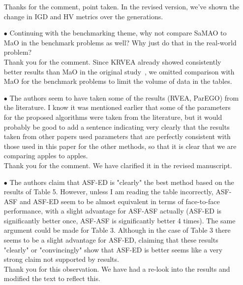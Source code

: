 \documentclass[onecolumn,10pt]{asme2ej}
\begin{document}
\begin{itemize}
{\color{blue} Thanks for the comment, point taken. In the revised version, we've shown the change in IGD and HV metrics over the generations.} \\

\item[$\bullet$]	Continuing with the benchmarking theme, why not compare SaMAO to MaO in the benchmark problems as well? Why just do that in the real-world problem? \\

{\color{blue}Thank you for the comment. Since KRVEA already showed consistently better results than MaO in the original study~\cite{KHTchugh2016krvea}, we omitted comparison with MaO for the benchmark problems to limit the volume of data in the tables.}\\


\item[$\bullet$]	The authors seem to have taken some of the results (RVEA, ParEGO) from the literature. I know it was mentioned earlier that some of the parameters for the proposed algorithms were taken from the literature, but it would probably be good to add a sentence indicating very clearly that the results taken from other papers used parameters that are perfectly consistent with those used in this paper for the other methods, so that it is clear that we are comparing apples to apples.\\

{\color{blue}Thank you for the comment. We have clarified it in the revised manuscript.}\\


\item[$\bullet$]	The authors claim that ASF-ED is "clearly" the best method based on the results of Table 5. However, unless I am reading the table incorrectly, ASF-ASF and ASF-ED seem to be almost equivalent in terms of face-to-face performance, with a slight advantage for ASF-ASF actually (ASF-ED is significantly better once, ASF-ASF is significantly better 4 times). The same argument could be made for Table 3. Although in the case of Table 3 there seems to be a slight advantage for ASF-ED, claiming that these results "clearly" or "convincingly" show that ASF-ED is better seems like a very strong claim not supported by results. \\

{\color{red} Thank you for this observation. We have had a re-look into the results and modified the text to reflect this.} \\



\end{itemize}
\end{document}
